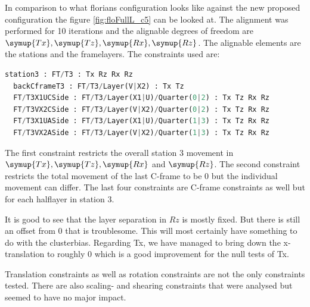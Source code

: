 In comparison to what florians configuration looks like against the new
proposed configuration the figure \ref{fig:floFullL_c5} can be looked at.
The alignment was performed for 10 iterations and the alignable degrees of
freedom are $\symup{Tx}, \symup{Tz}, \symup{Rx}, \symup{Rz}$. The alignable
elements are the stations and the framelayers.
The constraints used are: \\

\begin{lstlisting}[language=Python]
  station3 : FT/T3 : Tx Rz Rx Rz
  backCframeT3 : FT/T3/Layer(V|X2) : Tx Tz
  FT/T3X1UCSide : FT/T3/Layer(X1|U)/Quarter(0|2) : Tx Tz Rx Rz
  FT/T3VX2CSide : FT/T3/Layer(V|X2)/Quarter(0|2) : Tx Tz Rx Rz
  FT/T3X1UASide : FT/T3/Layer(X1|U)/Quarter(1|3) : Tx Tz Rx Rz
  FT/T3VX2ASide : FT/T3/Layer(V|X2)/Quarter(1|3) : Tx Tz Rx Rz
\end{lstlisting}

The first constraint restricts the overall station 3 movement in $\symup{Tx}, \symup{Tz},
\symup{Rx}$ and $\symup{Rz}$. The second constraint restricts the total movement
of the last C-frame to be 0 but the individual movement can differ.
The last four constraints are C-frame constraints as well but for each halflayer in station 3.

It is good to see that the layer separation in $Rz$ is mostly fixed. But there is still an offset from 0 that is troublesome. This will most certainly have something to do with the clusterbias. Regarding Tx, we have managed to bring down the x-translation to roughly 0 which is a good improvement for the null tests of Tx.

Translation constraints as well as rotation constraints are not the only constraints tested. There are also scaling- and shearing constraints that were analysed but seemed to have
no major impact.

%


